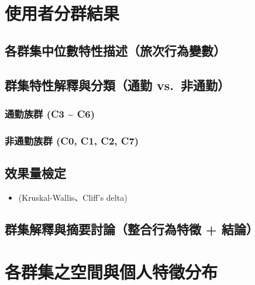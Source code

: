 \section{使用者分群結果}\label{ux4f7fux7528ux8005ux5206ux7fa4ux7d50ux679c}

\subsection{各群集中位數特性描述（旅次行為變數）}\label{ux5404ux7fa4ux96c6ux4e2dux4f4dux6578ux7279ux6027ux63cfux8ff0ux65c5ux6b21ux884cux70baux8b8aux6578}

\subsection{群集特性解釋與分類（通勤
vs.~非通勤）}\label{ux7fa4ux96c6ux7279ux6027ux89e3ux91cbux8207ux5206ux985eux901aux52e4-vs.-ux975eux901aux52e4}

\subsubsection{通勤族群 (C3 \textasciitilde{}
C6)}\label{ux901aux52e4ux65cfux7fa4-c3-c6}

\subsubsection{非通勤族群 (C0, C1, C2,
C7)}\label{ux975eux901aux52e4ux65cfux7fa4-c0-c1-c2-c7}

\subsection{效果量檢定}\label{ux6548ux679cux91cfux6aa2ux5b9a}

\begin{itemize}
\tightlist
\item
  (Kruskal-Wallis、Cliff's delta)
\end{itemize}

\subsection{群集解釋與摘要討論（整合行為特徵 +
結論）}\label{ux7fa4ux96c6ux89e3ux91cbux8207ux6458ux8981ux8a0eux8ad6ux6574ux5408ux884cux70baux7279ux5fb5-ux7d50ux8ad6}

\section{各群集之空間與個人特徵分布}\label{ux5404ux7fa4ux96c6ux4e4bux7a7aux9593ux8207ux500bux4ebaux7279ux5fb5ux5206ux5e03}

